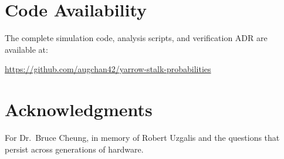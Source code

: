 \documentclass{article}
\begin{document}
\section*{Code Availability}

The complete simulation code, analysis scripts, and verification ADR are available at:

\url{https://github.com/augchan42/yarrow-stalk-probabilities}

\section*{Acknowledgments}

For Dr.\ Bruce Cheung, in memory of Robert Uzgalis and the questions that persist across generations of hardware.



\end{document}
